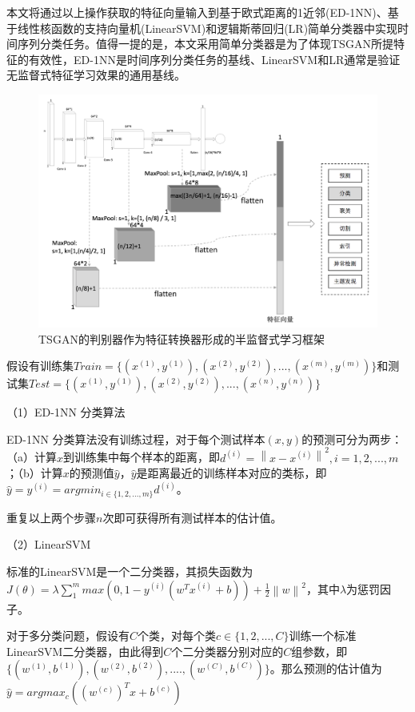 本文将通过以上操作获取的特征向量输入到基于欧式距离的1近邻(ED-1NN)、基于线性核函数的支持向量机(LinearSVM)和逻辑斯蒂回归(LR)简单分类器中实现时间序列分类任务。值得一提的是，本文采用简单分类器是为了体现TSGAN所提特征的有效性，ED-1NN是时间序列分类任务的基线、LinearSVM和LR通常是验证无监督式特征学习效果的通用基线。

\begin{figure}[H]
\centering
\includegraphics[scale=0.6]{figures/gan-semi-supervised-learning.png}
\caption{TSGAN的判别器作为特征转换器形成的半监督式学习框架}
\label{fig:gan-semi-supervised-learning}
\end{figure}

假设有训练集$Train = \{(x^{(1)}, y^{(1)}), (x^{(2)}, y^{(2)}), ..., (x^{(m)}, y^{(m)})\}$和测试集$Test = \{(x^{(1)}, y^{(1)}), (x^{(2)}, y^{(2)}), ..., (x^{(n)}, y^{(n)})\}$

（1）ED-1NN 分类算法

ED-1NN 分类算法没有训练过程，对于每个测试样本$(x,y)$的预测可分为两步：（a）计算$x$到训练集中每个样本的距离，即$d^{(i)} = \left \| x-x^{(i)} \right \|^{2},i=1,2,...,m$；（b）计算$x$的预测值$\hat{y}$，$\hat{y}$是距离最近的训练样本对应的类标，即$\hat{y}=y^{(i)}=argmin_{i \in \{1,2,...,m\}}d^{(i)}$。

重复以上两个步骤$n$次即可获得所有测试样本的估计值。

（2）LinearSVM

标准的LinearSVM是一个二分类器，其损失函数为$J(\theta) = \lambda\sum_{1}^{m}max(0, 1-y^{(i)}(w^{T}x^{(i)}+b)) +  \frac{1}{2}\left \| w \right \|^{2}$，其中$\lambda$为惩罚因子。

对于多分类问题，假设有$C$个类，对每个类$c \in \{1,2,...,C\}$训练一个标准LinearSVM二分类器，由此得到$C$个二分类器分别对应的$C$组参数，即$\{(w^{(1)}, b^{(1)}), (w^{(2)}, b^{(2)}), ...., (w^{(C)}, b^{(C)})\}$。那么预测的估计值为$\hat{y} = argmax_{c}((w^{(c)})^{T}x+b^{(c)})$

